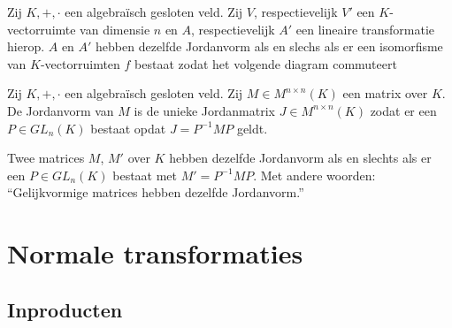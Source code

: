 \documentclass[main.tex]{subfiles}
\begin{document}
\begin{ei}
  Zij $K,+,\cdot$ een algebra\"isch gesloten veld.
  Zij $V$, respectievelijk $V'$ een $K$-vectorruimte van dimensie $n$ en $A$, respectievelijk $A'$ een lineaire transformatie hierop.
  $A$ en $A'$ hebben dezelfde Jordanvorm als en slechs als er een isomorfisme van $K$-vectorruimten $f$ bestaat zodat het volgende diagram commuteert
  \begin{figure}[H]
    \centering
  \end{figure}
\end{ei}

\begin{de}
  Zij $K,+,\cdot$ een algebra\"isch gesloten veld.
  Zij $M\in M^{n\times n}(K)$ een matrix over $K$.
  De Jordanvorm van $M$ is de unieke Jordanmatrix $J\in M^{n\times n}(K)$ zodat er een $P\in GL_{n}(K)$ bestaat opdat $J = P^{-1}MP$ geldt.
\end{de}

\begin{pr}
  Twee matrices $M$, $M'$ over $K$ hebben dezelfde Jordanvorm als en slechts als er een $P\in GL_{n}(K)$ bestaat met $M' = P^{-1}MP$.
  Met andere woorden: ``Gelijkvormige matrices hebben dezelfde Jordanvorm.''
\end{pr}

\section{Normale transformaties}
\label{sec:norm-transf}

\subsection{Inproducten}
\label{sec:inproducten}
\end{document}
